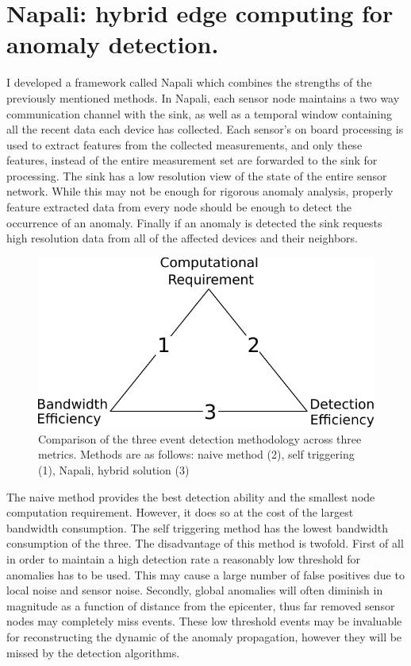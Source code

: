 \section{Napali: hybrid edge computing for anomaly detection.} \label{intro:section:napali}
  
I developed a framework called Napali which combines the strengths of the previously mentioned methods.
In Napali, each sensor node maintains a two way communication channel with the sink, as well as a temporal window containing all the recent data each device has collected.
Each sensor's on board processing is used to extract features from the collected measurements, and only these features, instead of the entire measurement set are forwarded to the sink for processing.
The sink has a low resolution view of the state of the entire sensor network.
While this may not be enough for rigorous anomaly analysis, properly feature extracted data from every node should be enough to detect the occurrence of an anomaly.
Finally if an anomaly is detected the sink requests high resolution data from all of the affected devices and their neighbors.

\begin{figure}[h]
	  \centering
	  \includegraphics[width=0.5\linewidth]{img/edge_computing_vs.pdf}
	\caption{Comparison of the three event detection methodology across three metrics.
	Methods are as follows: naive method (2), self triggering (1), Napali, hybrid solution (3)}
	\label{intro:fig:edge}
\end{figure}
The naive method provides the best detection ability and the smallest node computation requirement.
However, it does so at the cost of the largest bandwidth consumption.
The self triggering method has the lowest bandwidth consumption of the three.
The disadvantage of this method is twofold.
First of all in order to maintain a high detection rate a reasonably low threshold for anomalies has to be used.
This may cause a large number of false positives due to local noise and sensor noise.
Secondly, global anomalies will often diminish in magnitude as a function of distance from the epicenter, thus far removed sensor nodes may completely miss events.
These low threshold events may be invaluable for reconstructing the dynamic of the anomaly propagation, however they will be missed by the detection algorithms.


